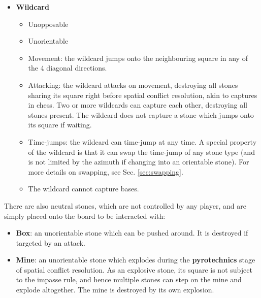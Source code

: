 \documentclass[12pt]{article}
\begin{document}
\begin{itemize}
\begin{itemize}
		\end{itemize}
	\item \textbf{Wildcard}
		\begin{itemize}
		\item Unopposable
		\item Unorientable
		\item Movement: the wildcard jumps onto the neighbouring square in any of the $4$ diagonal directions.
		\item Attacking: the wildcard attacks on movement, destroying all stones sharing its square right before spatial conflict resolution, akin to captures in chess. Two or more wildcards can capture each other, destroying all stones present. The wildcard does not capture a stone which jumps onto its square if waiting.
		\item Time-jumps: the wildcard can time-jump at any time. A special property of the wildcard is that it can swap the time-jump of any stone type (and is not limited by the azimuth if changing into an orientable stone). For more details on swapping, see Sec. \ref{sec:swapping}.
		\item The wildcard cannot capture bases.
		\end{itemize}
	\end{itemize}
	There are also neutral stones, which are not controlled by any player, and are simply placed onto the board to be interacted with:
	\begin{itemize}
		\item \textbf{Box}: an unorientable stone which can be pushed around. It is destroyed if targeted by an attack.
		\item \textbf{Mine}: an unorientable stone which explodes during the \textbf{pyrotechnics} stage of spatial conflict resolution. As an explosive stone, its square is not subject to the impasse rule, and hence multiple stones can step on the mine and explode altogether. The mine is destroyed by its own explosion.
	\end{itemize}
	
\end{document}
